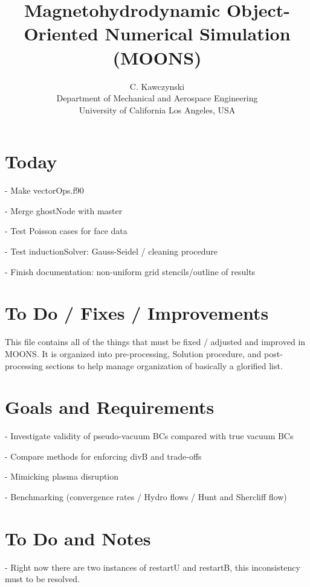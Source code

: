 \documentclass[11pt]{article}
\begin{document}
\doublespacing
\title{Magnetohydrodynamic Object-Oriented Numerical Simulation (MOONS)}
\author{C. Kawczynski \\
Department of Mechanical and Aerospace Engineering \\
University of California Los Angeles, USA\\
}
\maketitle

\section{Today}

- Make vectorOps.f90

- Merge ghostNode with master

- Test Poisson cases for face data

- Test inductionSolver: Gauss-Seidel / cleaning procedure

- Finish documentation: non-uniform grid stencils/outline of results

\section{To Do / Fixes / Improvements}
This file contains all of the things that must be fixed / adjusted and improved in MOONS. It is organized into pre-processing, Solution procedure, and post-processing sections to help manage organization of basically a glorified list.

\section{Goals and Requirements}

- Investigate validity of pseudo-vacuum BCs compared with true vacuum BCs

- Compare methods for enforcing divB and trade-offs

- Mimicking plasma disruption

- Benchmarking (convergence rates / Hydro flows / Hunt and Shercliff flow)

\section{To Do and Notes}
- Right now there are two instances of restartU and restartB, this inconsistency must to be resolved.
\end{document}

